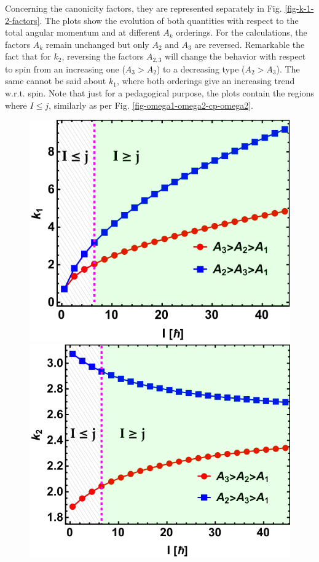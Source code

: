 Concerning the canonicity factors, they are represented separately in Fig. \ref{fig-k-1-2-factors}. The plots show the evolution of both quantities with respect to the total angular momentum and at different $A_k$ orderings. For the calculations, the factors $A_k$ remain unchanged but only $A_2$ and $A_3$ are reversed. Remarkable the fact that for $k_2$, reversing the factors $A_{2,3}$ will change the behavior with respect to spin from an increasing one ($A_3>A_2$) to a decreasing type ($A_2>A_3$). The same cannot be said about $k_1$, where both orderings give an increasing trend w.r.t. spin. Note that just for a pedagogical purpose, the plots contain the regions where $I\leq j$, similarly as per Fig. \ref{fig-omega1-omega2-cp-omega2}.
\begin{figure}
    \centering
    \includegraphics[scale=0.7]{Chapters/Figures/k1_factor.pdf}
    \includegraphics[scale=0.7]{Chapters/Figures/k2_factor.pdf}

\end{figure}
